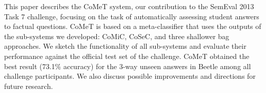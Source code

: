 This paper describes the CoMeT system, our contribution to the SemEval 2013 Task 7 challenge, focusing on the task of automatically assessing student
 answers to factual questions. CoMeT is based on a meta-classifier that uses the
 outputs of the sub-systems we developed: CoMiC, CoSeC, and three shallower bag
 approaches. We sketch the functionality of all sub-systems and evaluate their
 performance
 against the official test set of the challenge. CoMeT obtained the best result
 (73.1\% accuracy) for the 3-way unseen answers in Beetle among all challenge
 participants. We also discuss possible improvements and directions for future
 research.

